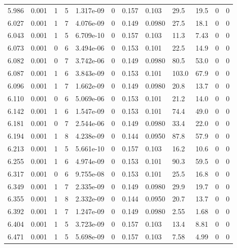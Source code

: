 \documentclass[preview]{standalone}
\begin{document}
{{{{{{\begin{tabular}{L{1.2cm}C{1.2cm} C{0.3cm}C{0.5cm} C{1.4cm}C{1.4cm} C{1.4cm}C{1.4cm} C{1.6cm}C{1.6cm} C{1.6cm}C{1.6cm}}
  5.986  &  0.001  & 1     &  5 &  1.317e-09  & 0  &  0.157&   0.103& 29.5 & 19.5   &  0 & 0  \\ 
  6.027  &  0.001  & 1     &  7 &  4.076e-09  & 0  &  0.149&   0.0980& 27.5 & 18.1   &  0 & 0  \\ 
  6.043  &  0.001  & 1     &  5 &  6.709e-10  & 0  &  0.157&   0.103& 11.3 & 7.43   &  0 & 0  \\ 
  6.073  &  0.001  & 0     &  6 &  3.494e-06  & 0  &  0.153&   0.101& 22.5 & 14.9   &  0 & 0  \\ 
  6.082  &  0.001  & 0     &  7 &  3.742e-06  & 0  &  0.149&   0.0980& 80.5 & 53.0   &  0 & 0  \\ 
  6.087  &  0.001  & 1     &  6 &  3.843e-09  & 0  &  0.153&   0.101& 103.0 & 67.9   &  0 & 0  \\ 
  6.096  &  0.001  & 1     &  7 &  1.662e-09  & 0  &  0.149&   0.0980& 20.8 & 13.7   &  0 & 0  \\ 
  6.110  &  0.001  & 0     &  6 &  5.069e-06  & 0  &  0.153&   0.101& 21.2 & 14.0   &  0 & 0  \\ 
  6.142  &  0.001  & 1     &  6 &  1.547e-09  & 0  &  0.153&   0.101& 74.4 & 49.0   &  0 & 0  \\ 
  6.181  &  0.001  & 0     &  7 &  2.544e-06  & 0  &  0.149&   0.0980& 33.4 & 22.0   &  0 & 0  \\ 
  6.194  &  0.001  & 1     &  8 &  4.238e-09  & 0  &  0.144&   0.0950& 87.8 & 57.9   &  0 & 0  \\ 
  6.213  &  0.001  & 1     &  5 &  5.661e-10  & 0  &  0.157&   0.103& 16.2 & 10.6   &  0 & 0  \\ 
  6.255  &  0.001  & 1     &  6 &  4.974e-09  & 0  &  0.153&   0.101& 90.3 & 59.5   &  0 & 0  \\ 
  6.317  &  0.001  & 0     &  6 &  9.755e-08  & 0  &  0.153&   0.101& 25.5 & 16.8   &  0 & 0  \\ 
  6.349  &  0.001  & 1     &  7 &  2.335e-09  & 0  &  0.149&   0.0980& 29.9 & 19.7   &  0 & 0  \\ 
  6.355  &  0.001  & 1     &  8 &  2.332e-09  & 0  &  0.144&   0.0950& 20.7 & 13.7   &  0 & 0  \\ 
  6.392  &  0.001  & 1     &  7 &  1.247e-09  & 0  &  0.149&   0.0980& 2.55 & 1.68   &  0 & 0  \\ 
  6.404  &  0.001  & 1     &  5 &  3.723e-09  & 0  &  0.157&   0.103& 13.4 & 8.81   &  0 & 0  \\ 
  6.471  &  0.001  & 1     &  5 &  5.698e-09  & 0  &  0.157&   0.103& 7.58 & 4.99   &  0 & 0  \\ 

\end{tabular}}}}}}}
\end{document}
